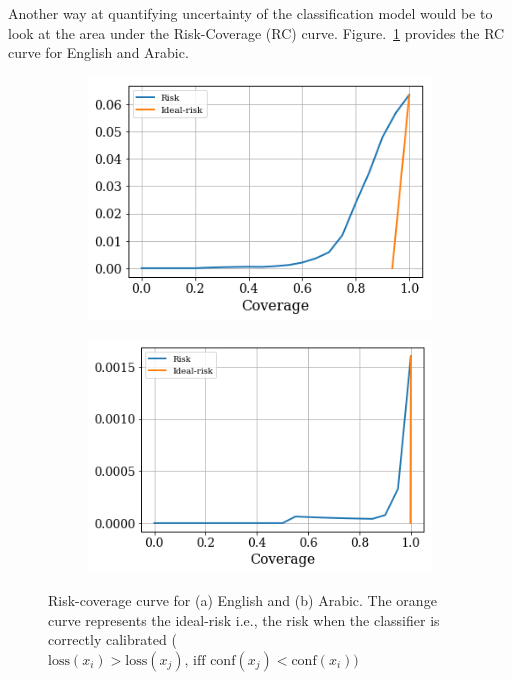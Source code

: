 Another way at quantifying uncertainty of the classification model would be to look at the area under the Risk-Coverage (RC) curve. Figure.~\ref{fig:engRisk} provides the RC curve for English and Arabic.
\begin{figure}
    \centering
    \begin{subfigure}[b]{0.45\textwidth}
         \centering
         \includegraphics[width=\textwidth]{figures/english_riskCoverage.png}
         \caption{}
         \label{fig:engRisk}
    \end{subfigure}
    \hfill
    \begin{subfigure}[b]{0.45\textwidth}
         \centering
         \includegraphics[width=\textwidth]{figures/arabic_riskCoverage.png}
         \caption{}
         \label{fig:y equals x}
     \end{subfigure}
     \caption{Risk-coverage curve for (a) English and (b) Arabic. The orange curve represents the ideal-risk i.e., the risk when the classifier is correctly calibrated
 ($\textrm{loss}(x_i) > \textrm{loss}(x_j) \textrm{, iff conf}(x_j) < \textrm{conf}(x_i))$}
\end{figure}

